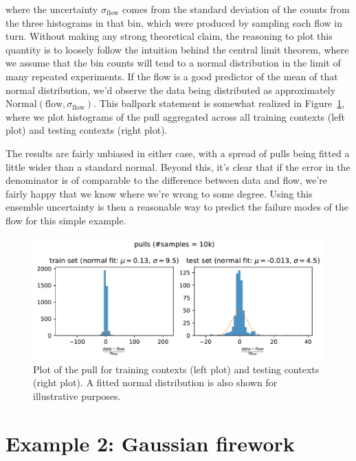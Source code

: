 \documentclass[
  11pt,
  numbers=noendperiod]{book}
\begin{document}
where the uncertainty \(\sigma_{\text{flow}}\) comes from the standard
deviation of the counts from the three histograms in that bin, which
were produced by sampling each flow in turn. Without making any strong
theoretical claim, the reasoning to plot this quantity is to loosely
follow the intuition behind the central limit theorem, where we assume
that the bin counts will tend to a normal distribution in the limit of
many repeated experiments. If the flow is a good predictor of the mean
of that normal distribution, we'd observe the data being distributed as
approximately \(\mathrm{Normal}(\text{flow}, \sigma_{\mathrm{flow}})\).
This ballpark statement is somewhat realized in
Figure~\ref{fig-simple-pulls}, where we plot histograms of the pull
aggregated across all training contexts (left plot) and testing contexts
(right plot).

The results are fairly unbiased in either case, with a spread of pulls
being fitted a little wider than a standard normal. Beyond this, it's
clear that if the error in the denominator is of comparable to the
difference between data and flow, we're fairly happy that we know where
we're wrong to some degree. Using this ensemble uncertainty is then a
reasonable way to predict the failure modes of the flow for this simple
example.

\begin{figure}

{\centering \includegraphics{./images/flows/simple/simpleflowpulls.pdf}

}

\caption{\label{fig-simple-pulls}Plot of the pull for training contexts
(left plot) and testing contexts (right plot). A fitted normal
distribution is also shown for illustrative purposes.}

\end{figure}

\hypertarget{example-2-gaussian-firework}{%
\section{Example 2: Gaussian
firework}\label{example-2-gaussian-firework}}
\end{document}
